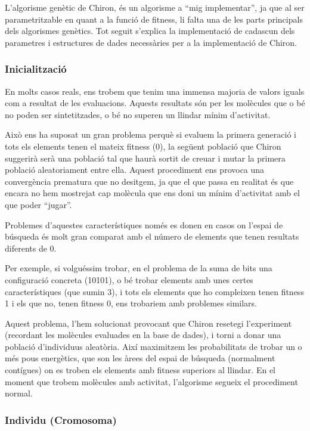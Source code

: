 \documentclass[titlepage,a4paper,12pt]{book}
\begin{document}
L'algorisme genètic de Chiron, és un algorisme a ``mig implementar'', ja que al
ser parametritzable en quant a la funció de fitness, li falta una de les parts
principals dels algorismes genètics.  Tot seguit s'explica la implementació de
cadascun dels parametres i estructures de dades necessàries per a la
implementació de Chiron.

\subsubsection{Inicialització} %
\label{ssub:Inicialitzacio}

En  molts casos reals, ens trobem que tenim una immensa majoria de valors iguals
com a resultat de les evaluacions.  Aquests resultats són per les molècules que
o bé no poden ser sintetitzades, o bé no superen un llindar mínim d'activitat.

Això ens ha suposat un gran problema perquè si evaluem la primera generació i
tots els elements tenen el mateix fitness (0), la següent població que Chiron
suggerirà serà una població tal que haurà sortit de creuar i mutar la primera
població aleatoriament entre ella.  Aquest procediment ens provoca una
convergència prematura que no desitgem, ja que el que passa en realitat és que
encara no hem mostrejat cap molècula que ens doni un mínim d'activitat amb el
que poder ``jugar''.

Problemes d'aquestes característiques només es donen en casos on l'espai de
búsqueda és molt gran comparat amb el número de elements que tenen resultats
diferents de 0.

Per exemple, si volguéssim trobar, en el problema de la suma de bits una
configuració concreta (10101), o bé trobar elements amb unes certes
característiques (que sumin 3), i tots els elements que ho compleixen tenen
fitness 1 i els que no, tenen fitness 0, ens trobariem amb problemes similars.

Aquest problema, l'hem solucionat provocant que Chiron resetegi l'experiment
(recordant les molècules evaluades en la base de dades), i torni a donar una
població d'individuus aleatòria.  Així maximitzem les probabilitats de trobar un
o més pous energètics, que son les àrees del espai de búsqueda (normalment
contígues) on es troben els elements amb fitness superiors al llindar.  En el
moment que trobem molècules amb activitat, l'algorisme segueix el procediment
normal.


\subsubsection{Individu (Cromosoma)}
\label{ssub:individu (cromosoma)}
\end{document}
